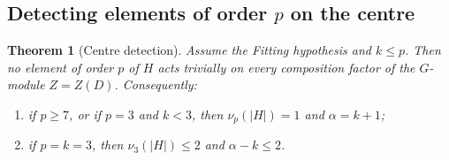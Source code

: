 \documentclass[11pt]{amsart}
\newtheorem{theorem}{Theorem}
\theoremstyle{definition}
\theoremstyle{remark}
\begin{document}
\subsection{Detecting elements of order \texorpdfstring{$p$}{p} on the centre}

\begin{theorem}[Centre detection]\label{thm:center}
Assume the Fitting hypothesis and $k\le p$. Then no element of order $p$ of $H$ acts trivially on every composition factor of the $G$-module $Z=Z(D)$. Consequently:
\begin{enumerate}
\item if $p\ge7$, or if $p=3$ and $k<3$, then $\nu_p(|H|)=1$ and $\alpha=k+1$;
\item if $p=k=3$, then $\nu_3(|H|)\le2$ and $\alpha-k\le2$.
\end{enumerate}
\end{theorem}
\end{document}
